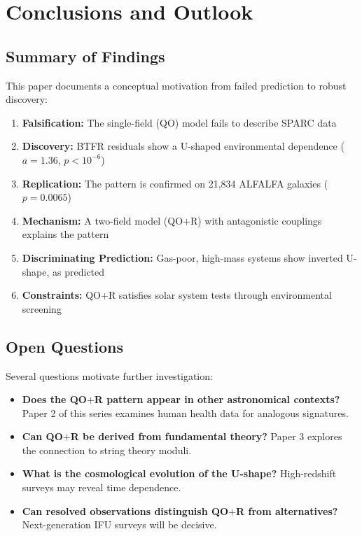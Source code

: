 \documentclass[12pt,a4paper]{article}
\newcommand{\QOR}{QO$+$R}
\begin{document}
\section{Conclusions and Outlook}
\label{sec:conclusions}

\subsection{Summary of Findings}

This paper documents a conceptual motivation from failed prediction to robust discovery:

\begin{enumerate}
    \item \textbf{Falsification:} The single-field (QO) model fails to describe SPARC data
    \item \textbf{Discovery:} BTFR residuals show a U-shaped environmental dependence ($a = 1.36$, $p < 10^{-6}$)
    \item \textbf{Replication:} The pattern is confirmed on 21,834 ALFALFA galaxies ($p = 0.0065$)
    \item \textbf{Mechanism:} A two-field model (\QOR{}) with antagonistic couplings explains the pattern
    \item \textbf{Discriminating Prediction:} Gas-poor, high-mass systems show inverted U-shape, as predicted
    \item \textbf{Constraints:} \QOR{} satisfies solar system tests through environmental screening
\end{enumerate}

\subsection{Open Questions}

Several questions motivate further investigation:

\begin{itemize}
    \item \textbf{Does the \QOR{} pattern appear in other astronomical contexts?} Paper 2 of this series examines human health data for analogous signatures.
    \item \textbf{Can \QOR{} be derived from fundamental theory?} Paper 3 explores the connection to string theory moduli.
    \item \textbf{What is the cosmological evolution of the U-shape?} High-redshift surveys may reveal time dependence.
    \item \textbf{Can resolved observations distinguish \QOR{} from alternatives?} Next-generation IFU surveys will be decisive.
\end{itemize}
\end{document}
